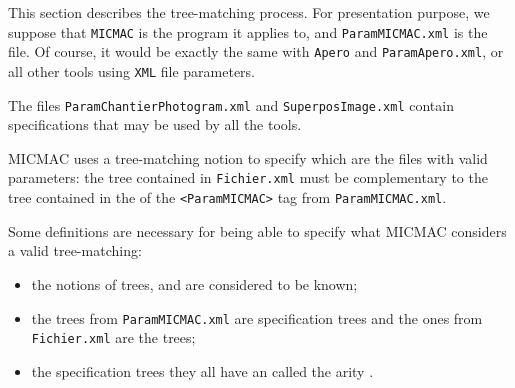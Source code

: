 This section describes the tree-matching process. For presentation purpose, we
suppose that {\tt MICMAC} is the program it applies to, and
{\tt ParamMICMAC.xml} is the file. Of course, it would be exactly the same
with {\tt Apero} and {\tt ParamApero.xml}, or all other tools
using {\tt XML} file parameters.

The files {\tt ParamChantierPhotogram.xml} and {\tt SuperposImage.xml} contain 
specifications that may be used by all the tools.


\label{FR:Mic:Tree:Match}

MICMAC uses a tree-matching notion to specify which are the files with valid parameters:
the tree contained in {\tt Fichier.xml} must be complementary to the tree contained in 
the  of the {\tt <ParamMICMAC>} tag from {\tt ParamMICMAC.xml}.

Some definitions are necessary for being able to specify what MICMAC considers
a valid tree-matching:
\begin{itemize}
    \item the notions of trees,  %
    and  are considered to be known;
    \item the trees from {\tt ParamMICMAC.xml} are specification trees and
    the ones from {\tt Fichier.xml} are the  trees;
    \item the specification trees they all have an  called the arity 
    .
\end{itemize}

\begin{comment}
MICMAC utilise une notion d'appariement d'arbres
pour  sp\'ecifier quels sont les fichiers de param\`etres valides :
l'arbre contenu dans {\tt Fichier.xml} doit \^etre appariable sur 
l'arbre contenu dans la descendance du  tag {\tt <ParamMICMAC>} contenu
dans la ressource {\tt ParamMICMAC.xml}.

Quelques d\'efinitions sont n\'ecessaires pour pouvoir pr\'eciser 
ce que MICMAC consid\`ere comme un appariement d'arbre valide :

\begin{itemize}
   \item les notions d'arbres, de fils et de n\oe{}uds terminaux sont suppos\'ees
         connues;
   \item  on appelle arbre de sp\'ecification les arbres de 
          {\tt ParamMICMAC.xml}  et arbre effectif les arbres de  
          {\tt Fichier.xml};
   \item les arbres de sp\'ecification ont tous un attibut dit attribut d'arit\'e;
         cet attribut, d\'esign\'e par le mot-clef $Nb$ peut valoir $1$,
         $?$, $*$ ou $+$; ce mot cl\'e repr\'esente un intervalle d'entier
         selon les conventions classiques : $1$=exactement un, $?$= un ou z\'ero,
         $+$=un au moins, $*$= un nombre quelconque;
    
\end{itemize}
\end{comment}


